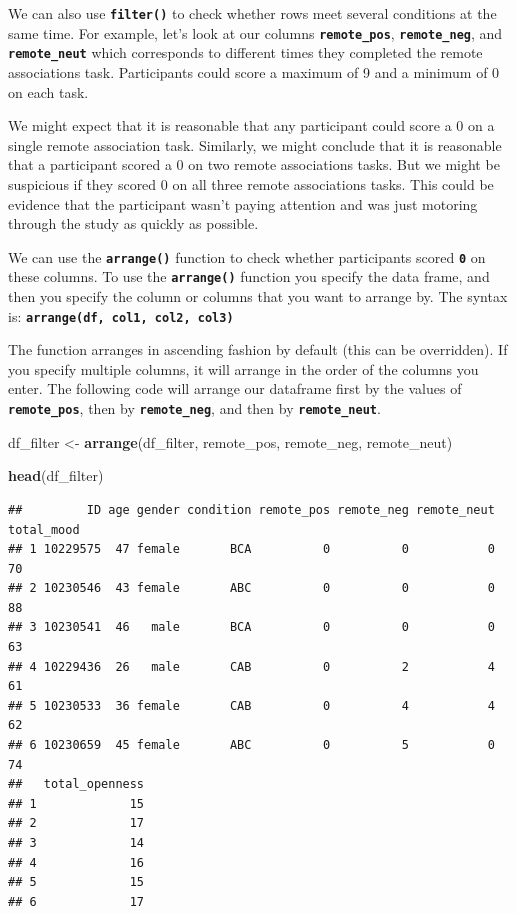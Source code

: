 \documentclass[
]{book}
\newenvironment{Shaded}{\begin{snugshade}}{\end{snugshade}}
\newcommand{\FunctionTok}[1]{\textcolor[rgb]{0.13,0.29,0.53}{\textbf{#1}}}
\newcommand{\NormalTok}[1]{#1}
\newcommand{\OtherTok}[1]{\textcolor[rgb]{0.56,0.35,0.01}{#1}}
\begin{document}
We can also use \textbf{\texttt{filter()}} to check whether rows meet several conditions at the same time. For example, let's look at our columns \textbf{\texttt{remote\_pos}}, \textbf{\texttt{remote\_neg}}, and \textbf{\texttt{remote\_neut}} which corresponds to different times they completed the remote associations task. Participants could score a maximum of 9 and a minimum of 0 on each task.

We might expect that it is reasonable that any participant could score a 0 on a single remote association task. Similarly, we might conclude that it is reasonable that a participant scored a 0 on two remote associations tasks. But we might be suspicious if they scored 0 on all three remote associations tasks. This could be evidence that the participant wasn't paying attention and was just motoring through the study as quickly as possible.

We can use the \textbf{\texttt{arrange()}} function to check whether participants scored \textbf{\texttt{0}} on these columns. To use the \textbf{\texttt{arrange()}} function you specify the data frame, and then you specify the column or columns that you want to arrange by. The syntax is: \textbf{\texttt{arrange(df,\ col1,\ col2,\ col3)}}

The function arranges in ascending fashion by default (this can be overridden). If you specify multiple columns, it will arrange in the order of the columns you enter. The following code will arrange our dataframe first by the values of \textbf{\texttt{remote\_pos}}, then by \textbf{\texttt{remote\_neg}}, and then by \textbf{\texttt{remote\_neut}}.

\begin{Shaded}
\begin{Highlighting}[]
\NormalTok{df\_filter }\OtherTok{\textless{}{-}} \FunctionTok{arrange}\NormalTok{(df\_filter, remote\_pos, remote\_neg, remote\_neut)}

\FunctionTok{head}\NormalTok{(df\_filter)}
\end{Highlighting}
\end{Shaded}

\begin{verbatim}
##         ID age gender condition remote_pos remote_neg remote_neut total_mood
## 1 10229575  47 female       BCA          0          0           0         70
## 2 10230546  43 female       ABC          0          0           0         88
## 3 10230541  46   male       BCA          0          0           0         63
## 4 10229436  26   male       CAB          0          2           4         61
## 5 10230533  36 female       CAB          0          4           4         62
## 6 10230659  45 female       ABC          0          5           0         74
##   total_openness
## 1             15
## 2             17
## 3             14
## 4             16
## 5             15
## 6             17
\end{verbatim}
\end{document}

